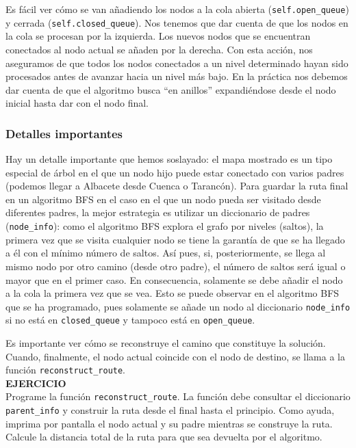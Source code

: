 \documentclass{article}
\begin{document}
Es fácil ver cómo se van añadiendo los nodos a la cola abierta (\texttt{self.open\_queue}) y cerrada (\texttt{self.closed\_queue}). Nos tenemos que dar cuenta de que los nodos en la cola se procesan por la izquierda. Los nuevos nodos que se encuentran conectados al nodo actual se añaden por la derecha. Con esta acción, nos aseguramos de que todos los nodos conectados a un nivel determinado hayan sido procesados antes de avanzar hacia un nivel más bajo. En la práctica nos debemos dar cuenta de que el algoritmo busca ``en anillos'' expandiéndose desde el nodo inicial hasta dar con el nodo final.


\subsubsection{Detalles importantes}
Hay un detalle importante que hemos soslayado: el mapa mostrado es un tipo especial de árbol en el que un nodo hijo puede estar conectado con varios padres (podemos llegar a Albacete desde Cuenca o Tarancón). Para guardar la ruta final en un algoritmo BFS en el caso en el que un nodo pueda ser visitado desde diferentes padres, la mejor estrategia es utilizar un diccionario de padres (\texttt{node\_info}): como el algoritmo BFS explora el grafo por niveles (saltos), la primera vez que se visita cualquier nodo se tiene la garantía de que se ha llegado a él con el mínimo número de saltos. Así pues, si, posteriormente, se llega al mismo nodo por otro camino (desde otro padre), el número de saltos será igual o mayor que en el primer caso. En consecuencia, solamente se debe añadir el nodo a la cola la primera vez que se vea. Esto se puede observar en el algoritmo BFS que se ha programado, pues solamente se añade un nodo al diccionario \texttt{node\_info} si no está en \texttt{closed\_queue} y tampoco está en \texttt{open\_queue}.

\begin{exercise}
Es importante ver cómo se reconstruye el camino que constituye la solución. Cuando, finalmente, el nodo actual coincide con el nodo de destino, se llama a la función \texttt{reconstruct\_route}.\\

\textbf{EJERCICIO}\\ 
Programe la función \texttt{reconstruct\_route}. La función debe consultar el diccionario \texttt{parent\_info} y construir la ruta desde el final hasta el principio. Como ayuda, imprima por pantalla el nodo actual y su padre mientras se construye la ruta. Calcule la distancia total de la ruta para que sea devuelta por el algoritmo.
\end{exercise}
\end{document}
